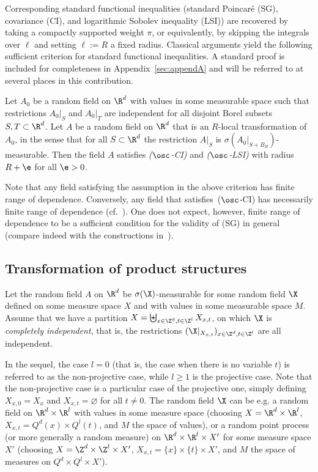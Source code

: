 Corresponding standard functional inequalities (standard Poincaré (SG), covariance (CI), and logarith\-mic Sobo\-lev inequality (LSI)) are recovered by taking a compactly supported weight $\pi$, or equivalently, by skipping the integrals over $\ell$ and setting $\ell:=R$ a fixed radius. Classical arguments yield the following sufficient criterion for standard functional inequalities. A standard proof is included for completeness in Appendix~\ref{sec:appendA} and will be referred to at several places in this contribution.

\begin{prop}\label{prop:criMSG}
Let $A_0$ be a random field on $\R^d$ with values in some measurable space such that restrictions $A_0|_{S}$ and $A_0|_T$ are independent for all disjoint Borel subsets $S,T\subset\R^d$. Let $A$ be a random field on $\R^d$ that is an $R$-local transformation of $A_0$, in the sense that for all $S\subset\R^d$ the restriction $A|_{S}$ is $\sigma(A_0|_{S+B_{R}})$-measurable. Then the field $A$ satisfies \emph{($\osc$-CI)} and \emph{($\osc$-LSI)} with radius $R+\e$ for all $\e>0$.
\end{prop}

Note that any field satisfying the assumption in the above criterion has finite range of dependence. Conversely, any field that satisfies~($\osc$-CI) has necessarily finite range of dependence (cf.~\cite[Proposition~1.4$\MK$(iv)]{DG1}). One does not expect, however, finite range of dependence to be a sufficient condition for the validity of (SG) in general (compare indeed with the constructions in~\cite{Burton-Goulet-Meester-93,Bradley-94}).


\subsection{Transformation of product structures}\label{eq:transfiid}

Let the random field $A$ on $\R^d$ be $\sigma(\X)$-measurable for some random field $\X$ defined on some measure space $X$ and with values in some measurable space $M$. Assume that we have a partition $X=\biguplus_{x\in\Z^d,t\in\Z^l}X_{x,t}$, on which $\X$ is \emph{completely independent}, that is, the restrictions $(\X|_{X_{x,t}})_{x\in\Z^d,t\in\Z^l}$ are all independent.


In the sequel, the case $l=0$ (that is, the case when there is no variable $t$) is referred to as the non-projective case, while $l\ge1$ is the projective case. Note that the non-projective case is a particular case of the projective one, simply defining $X_{x,0}=X_x$ and $X_{x,t}=\varnothing$ for all $t\ne0$. The random field $\X$ can be e.g. a random field on $\R^d\times\R^l$ with values in some measure space (choosing $X=\R^d\times\R^l$, $X_{x,t}=Q^d(x)\times Q^l(t)$, and $M$ the space of values), or a random point process (or more generally a random measure) on $\R^d\times\R^l\times X'$ for some measure space $X'$ (choosing $X=\Z^d\times\Z^l\times X'$, $X_{x,t}=\{x\}\times\{t\}\times X'$, and $M$ the space of measures on $Q^d\times Q^l\times X'$).

